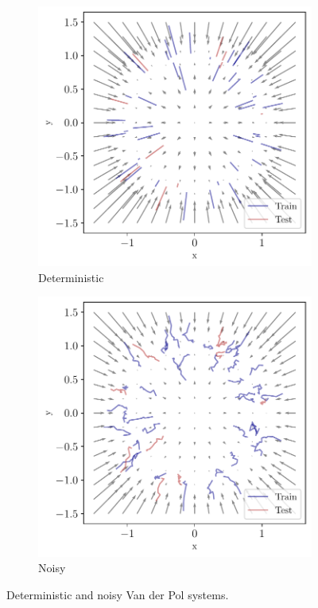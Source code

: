 \documentclass{article}
\theoremstyle{definition} \newtheorem{definition}{Definition}  \newtheorem{example}{Example}
\theoremstyle{remark} \newtheorem{remark}{Remark}
\newcounter{ct}
\begin{document}
\begin{figure}[htbp]
    \centering
    \begin{subfigure}[b]{0.48\linewidth}
        \centering
        \includegraphics[width=\linewidth]{ra_vf_trajs}
        \caption{Deterministic}
        \label{fig:ra_vf_trajs}
    \end{subfigure}
    \hfill
    \begin{subfigure}[b]{0.48\linewidth}
        \centering
        \includegraphics[width=\linewidth]{ranoisy_vf_trajs}
        \caption{Noisy}
        \label{fig:ranoisy_vf_trajs}
    \end{subfigure}
    \caption{Deterministic and noisy Van der Pol systems.}
    \label{fig:ra}
\end{figure}
\end{document}
